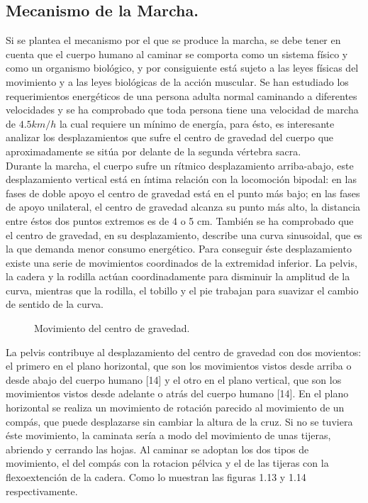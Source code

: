 
\subsection{Mecanismo de la Marcha.}

Si se plantea el mecanismo por el que se produce la marcha, se debe tener en cuenta que el cuerpo humano al caminar se comporta como un sistema físico y como un organismo biológico, y por consiguiente está sujeto a las leyes físicas del movimiento y a las leyes biológicas de la acción muscular. Se han estudiado los requerimientos energéticos de una persona adulta normal caminando a diferentes velocidades y se ha comprobado que toda persona tiene una velocidad de marcha de $4.5km/h$ la cual requiere un mínimo de energía, para ésto, es interesante analizar los desplazamientos que sufre el centro de gravedad del cuerpo que aproximadamente se sitúa por delante de la segunda vértebra sacra.\\

Durante la marcha, el cuerpo sufre un rítmico desplazamiento arriba-abajo, este desplazamiento vertical está en íntima relación con la locomoción bipodal: en las fases de doble apoyo el centro de gravedad está en el punto más bajo; en las fases de apoyo unilateral, el centro de gravedad alcanza su punto más alto, la distancia entre éstos dos puntos extremos es de 4 o 5 cm. También se ha comprobado que el centro de gravedad, en su desplazamiento, describe una curva sinusoidal, que es la que demanda menor consumo energético. Para conseguir éste desplazamiento existe una serie de movimientos coordinados de la extremidad inferior. La pelvis, la cadera y la rodilla actúan coordinadamente para disminuir la amplitud de la curva, mientras que la rodilla, el tobillo y el pie trabajan para suavizar el cambio de sentido de la curva.

\begin{figure}[h]
	\centering
	\caption{Movimiento del centro de gravedad.}
	\label{fig:dos}
\end{figure}
   
   
  La pelvis contribuye al desplazamiento del centro de gravedad con dos movientos: el primero en el plano horizontal, que son los movimientos vistos desde arriba o desde abajo del cuerpo humano [14] y el otro en el plano vertical, que son los movimientos vistos desde adelante o atrás del cuerpo humano [14]. En el plano horizontal se realiza un movimiento de rotación parecido al movimiento de un compás, que puede desplazarse sin cambiar la altura de la cruz. Si no se tuviera éste movimiento, la caminata sería a modo del movimiento de unas tijeras, abriendo y cerrando las hojas. Al caminar se adoptan los dos tipos de movimiento, el del compás con la rotacion pélvica y el de las tijeras con la flexoextención de la cadera. Como lo muestran las figuras 1.13 y 1.14 respectivamente.\\
  
